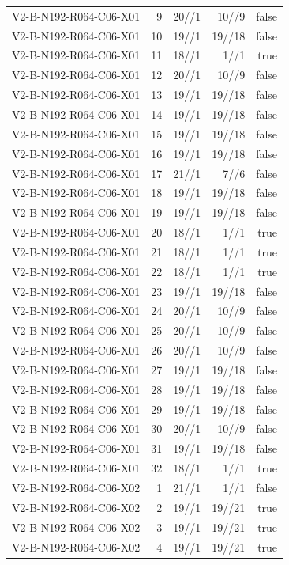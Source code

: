 {\begin{longtable}{lrrrr}
V2-B-N192-R064-C06-X01 & 9 & 20//1 & 10//9 & false \\
V2-B-N192-R064-C06-X01 & 10 & 19//1 & 19//18 & false \\
V2-B-N192-R064-C06-X01 & 11 & 18//1 & 1//1 & true \\
V2-B-N192-R064-C06-X01 & 12 & 20//1 & 10//9 & false \\
V2-B-N192-R064-C06-X01 & 13 & 19//1 & 19//18 & false \\
V2-B-N192-R064-C06-X01 & 14 & 19//1 & 19//18 & false \\
V2-B-N192-R064-C06-X01 & 15 & 19//1 & 19//18 & false \\
V2-B-N192-R064-C06-X01 & 16 & 19//1 & 19//18 & false \\
V2-B-N192-R064-C06-X01 & 17 & 21//1 & 7//6 & false \\
V2-B-N192-R064-C06-X01 & 18 & 19//1 & 19//18 & false \\
V2-B-N192-R064-C06-X01 & 19 & 19//1 & 19//18 & false \\
V2-B-N192-R064-C06-X01 & 20 & 18//1 & 1//1 & true \\
V2-B-N192-R064-C06-X01 & 21 & 18//1 & 1//1 & true \\
V2-B-N192-R064-C06-X01 & 22 & 18//1 & 1//1 & true \\
V2-B-N192-R064-C06-X01 & 23 & 19//1 & 19//18 & false \\
V2-B-N192-R064-C06-X01 & 24 & 20//1 & 10//9 & false \\
V2-B-N192-R064-C06-X01 & 25 & 20//1 & 10//9 & false \\
V2-B-N192-R064-C06-X01 & 26 & 20//1 & 10//9 & false \\
V2-B-N192-R064-C06-X01 & 27 & 19//1 & 19//18 & false \\
V2-B-N192-R064-C06-X01 & 28 & 19//1 & 19//18 & false \\
V2-B-N192-R064-C06-X01 & 29 & 19//1 & 19//18 & false \\
V2-B-N192-R064-C06-X01 & 30 & 20//1 & 10//9 & false \\
V2-B-N192-R064-C06-X01 & 31 & 19//1 & 19//18 & false \\
V2-B-N192-R064-C06-X01 & 32 & 18//1 & 1//1 & true \\
V2-B-N192-R064-C06-X02 & 1 & 21//1 & 1//1 & false \\
V2-B-N192-R064-C06-X02 & 2 & 19//1 & 19//21 & true \\
V2-B-N192-R064-C06-X02 & 3 & 19//1 & 19//21 & true \\
V2-B-N192-R064-C06-X02 & 4 & 19//1 & 19//21 & true \\

\end{longtable}}
